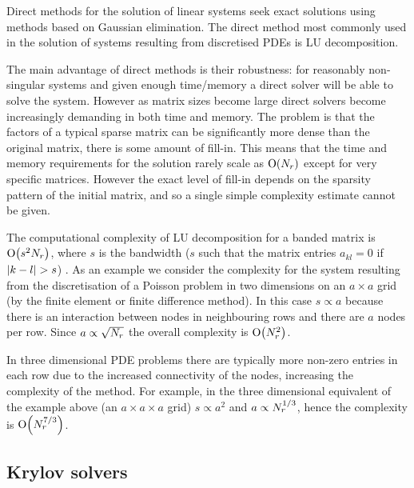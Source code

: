 Direct methods for the solution of linear systems seek exact solutions using methods based on Gaussian elimination.
The direct method most commonly used in the solution of systems resulting from discretised PDEs is LU decomposition.

The main advantage of direct methods is their robustness: for reasonably non-singular systems and given enough time/memory a direct solver will be able to solve the system.
However as matrix sizes become large direct solvers become increasingly demanding in both time and memory.
The problem is that the factors of a typical sparse matrix can be significantly more dense than the original matrix, \ie there is some amount of fill-in.
This means that the time and memory requirements for the solution rarely scale as $\mathrm{O}{\left( N_r \right)}$ except for very specific matrices.
However the exact level of fill-in depends on the sparsity pattern of the initial matrix, and so a single simple complexity estimate cannot be given.

The computational complexity of LU decomposition for a banded matrix is $\mathrm{O}{\left( s^2 N_r \right)}$, where $s$ is the bandwidth (\ie $s$ such that the matrix entries $a_{kl} = 0$ if $\left|{k - l} \right| > s$) \cite[236]{Iserles2009}.
As an example we consider the complexity for the system resulting from the discretisation of a Poisson problem in two dimensions on an $a \times a$ grid (by the finite element or finite difference method).
In this case $s \propto a$ because there is an interaction between nodes in neighbouring rows and there are $a$ nodes per row.
Since $a \propto \sqrt{N_r}$ the overall complexity is $\mathrm{O}{\left( N_r^2 \right)}$.

In three dimensional PDE problems there are typically more non-zero entries in each row due to the increased connectivity of the nodes, increasing the complexity of the method.
For example, in the three dimensional equivalent of the example above (an $a \times a \times a$ grid) $s \propto a^2$ and $a \propto N_r^{1/3}$, hence the complexity is $\mathrm{O}{\left( N_r^{7/3} \right)}$.


\subsection{Krylov solvers}
\label{sec:krylov-solvers}

